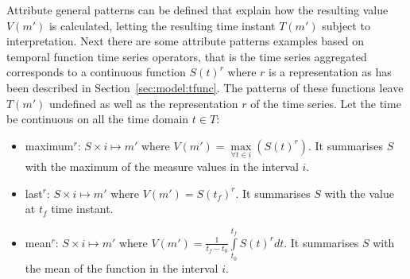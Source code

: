 



Attribute general patterns can be defined that explain how the
resulting value $V(m')$ is calculated, letting the resulting time
instant $T(m')$ subject to interpretation.  Next there are some
attribute patterns examples based on temporal function time series
operators, that is the time series aggregated corresponds to a
continuous function $S(t)^r$ where $r$ is a representation as has been
described in Section~\ref{sec:model:tfunc}. The patterns of these
functions leave $T(m')$ undefined as well as the representation $r$ of
the time series. Let the time be continuous on all the time domain
$t\in T$:
\begin{itemize}
\item maximum$^r$: $S \times i \mapsto m'$ where $V(m') =
  \max\limits_{\forall t \in i}(S(t)^r)$. It summarises $S$ with the maximum
  of the measure values in the interval $i$.
\item last$^r$: $S \times i \mapsto m'$ where $V(m') = S(t_f)^r$. It
  summarises $S$ with the value at $t_f$ time instant.
\item mean$^r$: $S \times i \mapsto m'$ where $V(m') =
  \frac{1}{t_f-t_0} \int\limits_{t_0}^{t_f} S(t)^r dt$. It summarises $S$
  with the mean of the function in the interval $i$.
\end{itemize}


